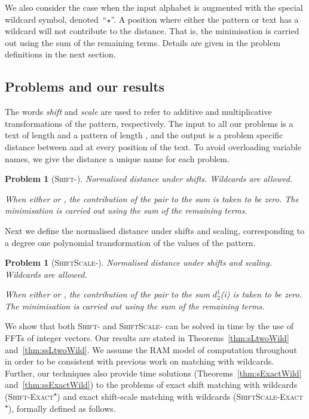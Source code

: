 \documentclass[11pt]{article}
\newcommand{\wildcard}{\ensuremath{\star}\xspace}
\newcommand{\sExactWild}{\textsc{Shift-Exact\textsuperscript{\wildcard}}\xspace}
\newcommand{\ssExactWild}{\textsc{ShiftScale-Exact\textsuperscript{\wildcard}}\xspace}
\newcommand{\sLtwoWild}{\textsc{Shift-}\xspace}
\newcommand{\ssLtwoWild}{\textsc{ShiftScale-}\xspace}
\newcommand{\DssLtwoWild}{\ensuremath{d_2^{1}}}
\theoremstyle{plain}
\newtheorem{problem}[theorem]{Problem}
\theoremstyle{definition}
\begin{document}
We also consider the case when the input alphabet is augmented with the special wildcard symbol, denoted~``\wildcard''. A position where either the pattern or text has a wildcard will not contribute to the distance. That is, the minimisation is carried out using the sum of the remaining terms. Details are given in the problem definitions in the next section.



\subsection{Problems and our results}\label{sec:problems}

The words \emph{shift} and \emph{scale} are used to refer to additive and multiplicative transformations of the pattern, respectively. The input to all our problems is a text  of length  and a pattern  of length , and the output is a problem specific distance  between  and  at every position  of the text. To avoid overloading variable names, we give the distance  a unique name for each problem.

\begin{problem}[\sLtwoWild]
    \label{prob:sLtwoWild}
    Normalised  distance under shifts. Wildcards are allowed.

When either  or , the contribution of the pair to the sum  is taken to be zero. The minimisation is carried out using the sum of the remaining terms.
\end{problem}

Next we define the normalised  distance under shifts and scaling, corresponding to a degree one polynomial transformation of the values of the pattern.

\begin{problem}[\ssLtwoWild]
    Normalised  distance under shifts and scaling. Wildcards are allowed.

When either  or , the contribution of the pair to the sum \DssLtwoWild(i) is taken to be zero. The minimisation is carried out using the sum of the remaining terms.
\end{problem}

We show that both \sLtwoWild and \ssLtwoWild can be solved in  time by the use of FFTs of integer vectors. Our results are stated in Theorems~\ref{thm:sLtwoWild} and~\ref{thm:ssLtwoWild}. We assume the RAM model of computation throughout in order to be consistent with previous work on matching with wildcards. Further, our techniques also provide  time solutions (Theorems~\ref{thm:sExactWild} and~\ref{thm:ssExactWild}) to the problems of exact shift matching with wildcards (\sExactWild) and exact shift-scale matching with wildcards (\ssExactWild), formally defined as follows.
\end{document}
